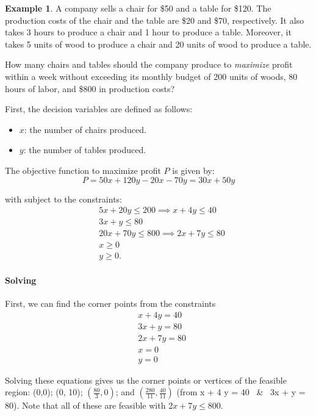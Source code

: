 \documentclass[oneside,11pt,dvipsnames]{book}
\numberwithin{equation}{section}
\theoremstyle{definition}
\newtheorem{example}{Example}[section]
\theoremstyle{remark}
\begin{document}
\begin{example}\label{ex:lp-example3}
A company sells a chair for \$50 and a table for \$120. The production costs of the chair and the table are \$20 and \$70, respectively. It also takes 3 hours to produce a chair and 1 hour to produce a table. 
Moreover, it takes 5 units of wood to produce a chair and 20 units of wood to produce a table.

How many chairs and tables should the company produce to \emph{maximize} profit within a week without exceeding its monthly budget of 200 units of woods, 80 hours of labor, and \$800 in production costs? 

First, the decision variables are defined as follows:
\begin{itemize}
    \item $x$: the number of chairs produced.
    \item $y$: the number of tables produced.
\end{itemize}

The objective function to maximize profit $P$ is given by:
\[
P = 50x + 120y - 20x - 70y = 30x + 50y
\]

with subject to the constraints:
\[
\begin{aligned}
& 5x + 20y \le 200 \implies x + 4y \le 40\\
& 3x + y \le 80 \\
& 20x + 70y \le 800 \implies 2x + 7y \le 80\\
& x \ge 0 \\
& y \ge 0.
\end{aligned}
\]

\paragraph{Solving}

First, we can find the corner points from the constraints
\[
\begin{aligned}
    & x + 4y = 40 \\
    & 3x + y = 80 \\
    & 2x + 7y = 80 \\
    & x = 0 \\
    & y = 0
\end{aligned}
\]

Solving these equations gives us the corner points or vertices of the feasible region:
(0,0);
(0, 10);
$(\frac{80}{3} ,0)$; and 
$(\frac{280}{11},\frac{40}{11})$ (from x + 4 y = 40 ~\&~ 3x + y = 80). 
Note that all of these are feasible with $2x + 7y \le 800$.





\end{example}
\end{document}
